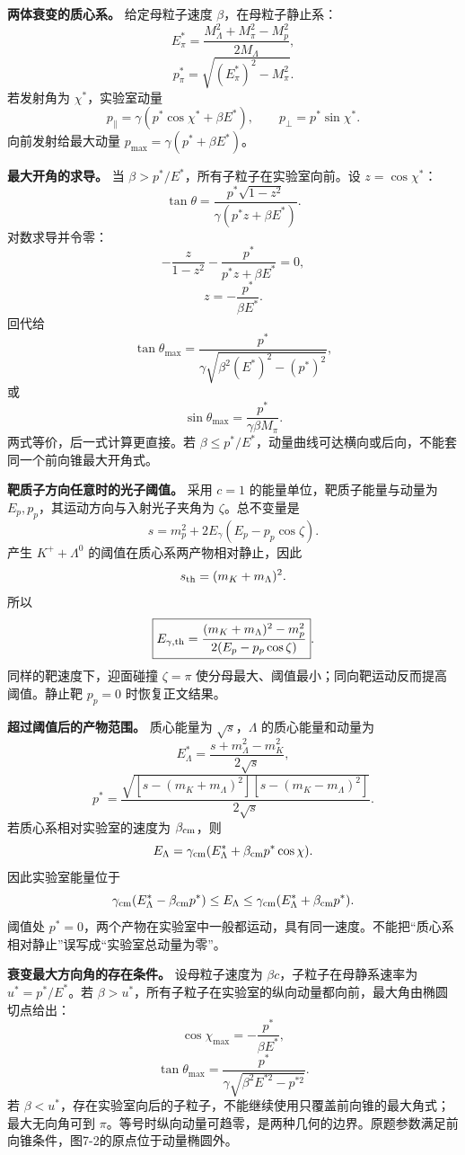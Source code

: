 \documentclass[12pt,a4paper,UTF8]{ctexart}
\begin{document}
\textbf{两体衰变的质心系。} 给定母粒子速度 \(\beta\)，在母粒子静止系：
\[
E_\pi^*=\frac{M_\Lambda^2+M_\pi^2-M_p^2}{2M_\Lambda},
\] \[
p_\pi^*=\sqrt{(E_\pi^*)^2-M_\pi^2}.
\] 若发射角为 \(\chi^*\)，实验室动量 \[
p_\parallel=\gamma(p^*\cos\chi^*+\beta E^*),\qquad
p_\perp=p^*\sin\chi^*.
\] 向前发射给最大动量 \(p_{\max}=\gamma(p^*+\beta E^*)\)。

\textbf{最大开角的求导。} 当
\(\beta>p^*/E^*\)，所有子粒子在实验室向前。设 \(z=\cos\chi^*\)： \[
\tan\theta=\frac{p^*\sqrt{1-z^2}}{\gamma(p^*z+\beta E^*)}.
\] 对数求导并令零： \[
-\frac z{1-z^2}-\frac{p^*}{p^*z+\beta E^*}=0,
\] \[
z=-\frac{p^*}{\beta E^*}.
\] 回代给 \[
\tan\theta_{\max}=\frac{p^*}{\gamma\sqrt{\beta^2(E^*)^2-(p^*)^2}},
\] 或 \[
\sin\theta_{\max}=\frac{p^*}{\gamma\beta M_\pi}.
\] 两式等价，后一式计算更直接。若
\(\beta\le p^*/E^*\)，动量曲线可达横向或后向，不能套同一个前向锥最大开角式。

\textbf{靶质子方向任意时的光子阈值。} 采用 \(c=1\)
的能量单位，靶质子能量与动量为 \(E_p,p_p\)，其运动方向与入射光子夹角为
\(\zeta\)。总不变量是 \[
s=m_p^2+2E_\gamma(E_p-p_p\cos\zeta).
\] 产生 \(K^++\Lambda^0\) 的阈值在质心系两产物相对静止，因此 \[
s_{\rm th}=(m_K+m_\Lambda)^2.
\] 所以 \[
\boxed{E_{\gamma,\rm th}=
\frac{(m_K+m_\Lambda)^2-m_p^2}
{2(E_p-p_p\cos\zeta)}}.
\] 同样的靶速度下，迎面碰撞 \(\zeta=\pi\)
使分母最大、阈值最小；同向靶运动反而提高阈值。静止靶 \(p_p=0\)
时恢复正文结果。

\textbf{超过阈值后的产物范围。} 质心能量为 \(\sqrt s\)，\(\Lambda\)
的质心能量和动量为 \[
E_\Lambda^*=\frac{s+m_\Lambda^2-m_K^2}{2\sqrt s},
\] \[
p^*=\frac{\sqrt{[s-(m_K+m_\Lambda)^2]
[s-(m_K-m_\Lambda)^2]}}{2\sqrt s}.
\] 若质心系相对实验室的速度为 \(\beta_{\rm cm}\)，则 \[
E_\Lambda=\gamma_{\rm cm}
(E_\Lambda^*+\beta_{\rm cm}p^*\cos\chi).
\] 因此实验室能量位于 \[
\gamma_{\rm cm}(E_\Lambda^*-\beta_{\rm cm}p^*)
\le E_\Lambda\le
\gamma_{\rm cm}(E_\Lambda^*+\beta_{\rm cm}p^*).
\] 阈值处
\(p^*=0\)，两个产物在实验室中一般都运动，具有同一速度。不能把``质心系相对静止''误写成``实验室总动量为零''。

\textbf{衰变最大方向角的存在条件。} 设母粒子速度为
\(\beta c\)，子粒子在母静系速率为 \(u^*=p^*/E^*\)。若
\(\beta>u^*\)，所有子粒子在实验室的纵向动量都向前，最大角由椭圆切点给出：
\[
\cos\chi_{\max}=-\frac{p^*}{\beta E^*},
\] \[
\boxed{\tan\theta_{\max}=
\frac{p^*}{\gamma\sqrt{\beta^2E^{*2}-p^{*2}}}}.
\] 若
\(\beta<u^*\)，存在实验室向后的子粒子，不能继续使用只覆盖前向锥的最大角式；最大无向角可到
\(\pi\)。等号时纵向动量可趋零，是两种几何的边界。原题参数满足前向锥条件，图7-2的原点位于动量椭圆外。
\end{document}
